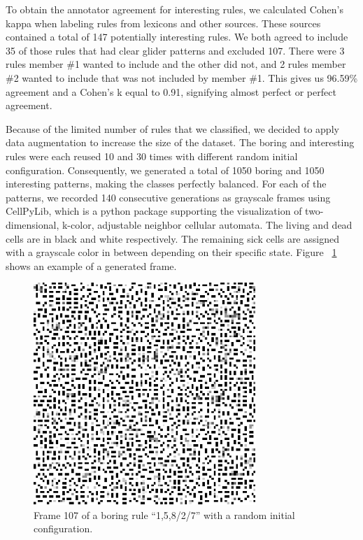 \documentclass[12pt]{article}
\numberwithin{figure}{section} %
\begin{document}
To obtain the annotator agreement for interesting rules, we calculated Cohen’s kappa when labeling rules from lexicons and other sources. These sources contained a total of 147 potentially interesting rules. We both agreed to include 35 of those rules that had clear glider patterns and excluded 107. There were 3 rules member \#1 wanted to include and the other did not, and 2 rules member \#2 wanted to include that was not included by member \#1. This gives us 96.59\% agreement and a Cohen’s k equal to 0.91, signifying almost perfect or perfect agreement. 

Because of the limited number of rules that we classified, we decided to apply data augmentation to increase the size of the dataset. The boring and interesting rules were each reused 10 and 30 times with different random initial configuration. Consequently, we generated a total of 1050 boring and 1050 interesting patterns, making the classes perfectly balanced. For each of the patterns, we recorded 140 consecutive generations as grayscale frames using CellPyLib, which is a python package supporting the visualization of two-dimensional, k-color, adjustable neighbor cellular automata. The living and dead cells are in black and white respectively. The remaining sick cells are assigned with a grayscale color in between depending on their specific state. Figure ~\ref{fig:generated frame example} shows an example of a generated frame. 

\begin{figure}[H]
\centering
\includegraphics[width=0.5\linewidth]{Section3/1}
\caption[Example of a generated frame]{Frame 107 of a boring rule “1,5,8/2/7” with a random initial configuration. }
\vspace{-1.5em}
\label{fig:generated frame example}
\end{figure}
\end{document}
